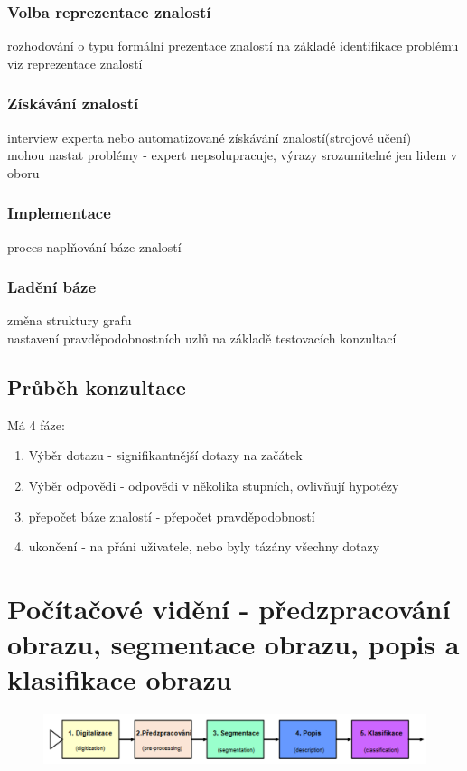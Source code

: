 \subsubsection{Volba reprezentace znalostí}
rozhodování o typu formální prezentace znalostí na základě identifikace problému\\
viz reprezentace znalostí\\

\subsubsection{Získávání znalostí}
interview experta nebo automatizované získávání znalostí(strojové učení)\\
mohou nastat problémy - expert nepsolupracuje, výrazy srozumitelné jen lidem v oboru\\

\subsubsection{Implementace}
proces naplňování báze znalostí\\

\subsubsection{Ladění báze}
změna struktury grafu\\
nastavení pravděpodobnostních uzlů na základě testovacích konzultací\\

\subsection{Průběh konzultace}
Má 4 fáze:
\begin{enumerate}
    \item Výběr dotazu - signifikantnější dotazy na začátek
    \item Výběr odpovědi - odpovědi v několika stupních, ovlivňují hypotézy
    \item přepočet báze znalostí - přepočet pravděpodobností
    \item ukončení - na přáni uživatele, nebo byly tázány všechny dotazy
\end{enumerate}

\section{Počítačové vidění - předzpracování obrazu, segmentace obrazu, popis a klasifikace obrazu}
\begin{figure}[H]
    \includegraphics[scale = 0.4]{images/pc_videni.png}
\end{figure}
